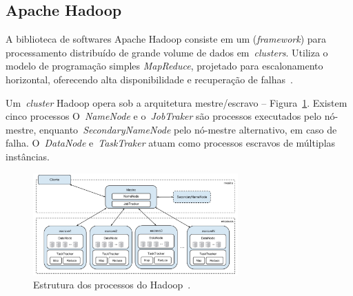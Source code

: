 \documentclass[12pt]{article}
\begin{document}
\subsection{Apache Hadoop}
\label{subsection:hadoop}

A biblioteca de softwares Apache Hadoop consiste em um (\textit{framework}) para processamento distribuído de grande volume de dados em~\emph{clusters}. Utiliza o modelo de programação simples \emph{MapReduce}, projetado para escalonamento horizontal, oferecendo alta disponibilidade e recuperação de falhas~\cite{hadoophbase}.

Um~\emph{cluster} Hadoop opera sob a arquitetura mestre/escravo -- Figura~\ref{figure:hadoop}. Existem cinco processos O~\emph{NameNode} e o~\emph{JobTraker} são processos executados pelo nó-mestre, enquanto~\emph{SecondaryNameNode} pelo nó-mestre alternativo, em caso de falha. O~\emph{DataNode} e~\emph{TaskTraker} atuam como processos escravos de múltiplas instâncias. %

\begin{figure}[!ht]
\centering
\includegraphics[width=0.7\textwidth]{images/hadoop.png}
\caption{Estrutura dos processos do Hadoop~\cite{goldman2012apache}.}
\label{figure:hadoop}
\end{figure}


\end{document}
